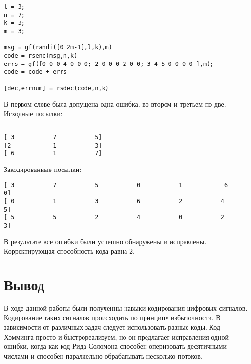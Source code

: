 \documentclass[10pt,a4paper,oneside]{article}
\begin{document}
 \begin{verbatim}
l = 3; 
n = 7; 
k = 3; 
m = 3; 

msg = gf(randi([0 2m-1],l,k),m)
code = rsenc(msg,n,k)
errs = gf([0 0 0 4 0 0 0; 2 0 0 0 2 0 0; 3 4 5 0 0 0 0 ],m);
code = code + errs

[dec,errnum] = rsdec(code,n,k)
 \end{verbatim}

В первом слове была допущена одна ошибка, во втором и третьем по две.
Исходные посылки:
 \begin{verbatim}

[ 3           7           5]
[2            1           3]
[ 6           1           7]
 \end{verbatim}
Закодированные посылки:
 \begin{verbatim}
[ 3           7           5           0           1            6          0]
[ 0           1           3           6           2           4           5]
[ 5           5           2           4           0           2           3]
 \end{verbatim}
 
 В результате все ошибки были успешно обнаружены и исправлены. Корректирующая способность кода равна 2.

\section{Вывод}
В ходе данной работы были полученны навыки кодирования цифровых сигналов. Кодирование таких сигналов происходить по принципу избыточности. В зависимости от различных задач следует использовать разные коды. Код Хэмминга просто и быстрореализуем, но он предлагает исправления одной ошибки, когда как код Рида-Соломона способен оперировать десятичными числами и способен параллельно обрабатывать несколько потоков.
\end{document}
